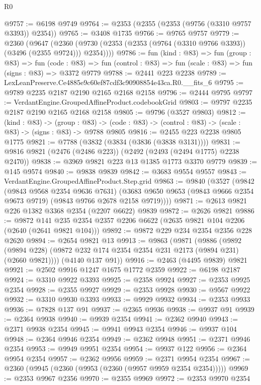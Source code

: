 \begin{lexlean}{R0}
\begin{coremodule}
@9757 := @6198 @9749
@9764 := @2353 (@2355 (@2353 (@9756 (@3310 @9757 @3393)) @2354))
@9765 := @3408 @1735
@9766 := @9765 @9757
@9779 := @2360
    (@9647 (@2360 (@9730 (@2353 (@2353 (@9764 (@3310 @9766 @3393)) (@3496 (@2355 @9724))) @2354))))
@9786 := fun (kind : @83) =>
  fun (group : @83) =>
  fun (code : @83) => fun (control : @83) => fun (scale : @83) => fun (signs : @83) => @3372 @9779
@9788 := @2441 @223 @2238
@9789 := LexLeanPreserve.Ce4885e9c60ef87cdf3c90908854e43ca.R0.__fits_6
@9795 := @9789 @2235 @2187 @2190 @2165 @2168 @2158
@9796 := @2444 @9795
@9797 := VerdantEngine.GroupedAffineProduct.codebookGrid
@9803 := @9797 @2235 @2187 @2190 @2165 @2168 @2158
@9805 := @9796 (@3527 @9803)
@9812 := (kind : @83) ->
  (group : @83) -> (code : @83) -> (control : @83) -> (scale : @83) -> (signs : @83) -> @9788 @9805
@9816 := @2455 @223 @2238 @9805 @1775
@9821 := @7788 (@3832 (@3834 (@3836 (@3838 @3131))))
@9831 := @9816 @9821 (@2476 (@2486 @223)) (@2492 (@2493 (@2494 @1775) @2238 @2470))
@9838 := @3969 @9821 @223 @13 @1385 @1773 @3370 @9779
@9839 := @145 @9574
@9840 := @9838 @9839
@9842 := @3683 @9554 @9557
@9843 := VerdantEngine.GroupedAffineProduct.Step.grid
@9863 := @9840
    (@3527
      (@9842
        (@9843 @9568 @2354 @9636 @7631)
        (@3683 @9650 @9653 (@9843 @9666 @2354 @9673 @9719) (@9843 @9766 @2678 @2158 @9719))))
@9871 := @2613 @9821 @226 @1382 @3368 @2354 (@2207 @6622) @9839
@9872 := @2626 @9821
@9886 := @9872 @141 @235 @2354 @2357 @2206 @6622 (@2635 @9821 @104 @2206 (@2640 (@2641 @9821 @104)))
@9892 := @9872 @229 @234 @2354 @2356 @228 @2620
@9894 := @2654 @9821 @13
@9913 := @9863
    (@9871
      (@9886
        (@9892 (@9894 @228) (@9872 @232 @174 @2354 @2354 @231 @2173 (@9894 @231) (@2660 @9821))))
      (@4140 @137 @91))
@9916 := @2463 (@4495 @9839) @9821
@9921 := @2502 @9916 @1247 @1675 @1772 @2359
@9922 := @6198 @2187
@9924 := @3310 @9922 @3393
@9925 := @2358 @9924
@9927 := @2353 @9925 @2354
@9928 := @2355 @9927
@9929 := @2353 @9928
@9930 := @9567 @9922
@9932 := @3310 @9930 @3393
@9933 := @9929 @9932
@9934 := @2353 @9933
@9936 := @7828 @137 @91
@9937 := @2365 @9936
@9938 := @9937 @91
@9939 := @2364 @9938
@9940 := @9939 @2354
@9941 := @2362 @9940
@9943 := @2371 @9938 @2354
@9945 := @9941 @9943 @2354
@9946 := @9937 @104
@9948 := @2364 @9946 @2354
@9949 := @2362 @9948
@9951 := @2371 @9946 @2354
@9953 := @9949 @9951 @2354
@9954 := @9937 @122
@9956 := @2364 @9954 @2354
@9957 := @2362 @9956
@9959 := @2371 @9954 @2354
@9967 := @2360 (@9945 (@2360 (@9953 (@2360 (@9957 @9959 @2354 @2354)))))
@9969 := @2353 @9967 @2356
@9970 := @2355 @9969
@9972 := @2353 @9970 @2354

\end{coremodule}
\end{lexlean}
